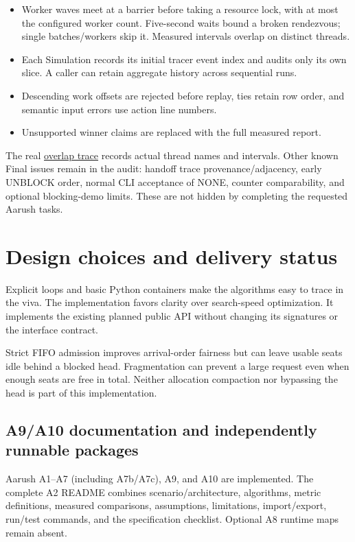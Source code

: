 \documentclass[11pt,a4paper]{article}
\begin{document}
\begin{itemize}
\item Worker waves meet at a barrier before taking a resource lock, with at
most the configured worker count. Five-second waits bound a broken rendezvous;
single batches/workers skip it. Measured intervals overlap on distinct threads.
\item Each Simulation records its initial tracer event index and audits only
its own slice. A caller can retain aggregate history across sequential runs.
\item Descending work offsets are rejected before replay, ties retain row
order, and semantic input errors use action line numbers.
\item Unsupported winner claims are replaced with the full measured report.
\end{itemize}

The real \href{overlap_evidence.txt}{overlap trace} records actual thread names
and intervals. Other known Final issues remain in the audit: handoff trace
provenance/adjacency, early UNBLOCK order, normal CLI acceptance of NONE,
counter comparability, and optional blocking-demo limits. These are not hidden
by completing the requested Aarush tasks.

\section{Design choices and delivery status}

Explicit loops and basic Python containers make the algorithms easy to trace
in the viva. The implementation favors clarity over search-speed optimization.
It implements the existing planned public API without changing its signatures
or the interface contract.

Strict FIFO admission improves arrival-order fairness but can leave usable
seats idle behind a blocked head. Fragmentation can prevent a large request
even when enough seats are free in total. Neither allocation compaction nor
bypassing the head is part of this implementation.

\subsection{A9/A10 documentation and independently runnable packages}
Aarush A1--A7 (including A7b/A7c), A9, and A10 are implemented. The complete
A2 README combines scenario/architecture, algorithms, metric definitions,
measured comparisons, assumptions, limitations, import/export, run/test commands,
and the specification checklist. Optional A8 runtime maps remain absent.
\end{document}

